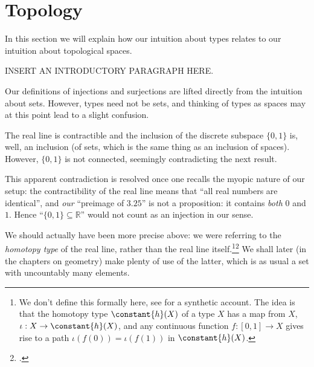 \section{Topology}

In this section we will explain how our intuition about types relates to our intuition about topological spaces.

INSERT AN INTRODUCTORY PARAGRAPH HERE.

\begin{remark}
  \label{rem:injectionsurjectionisnotwhatyouthink}
  Our definitions of injections and surjections are lifted directly from the intuition about sets.  However, types need not be sets, and
  thinking of types as spaces may at this point lead to a slight confusion.

  The real line is contractible and the inclusion of the discrete subspace $\{0,1\}$ is, well, an inclusion (of sets, which is the same thing as
  an inclusion of spaces).  However, $\{0,1\}$ is not connected, seemingly contradicting the next result.

  This apparent contradiction is resolved once one recalls the myopic nature of our setup: the contractibility of the real line means that ``all
  real numbers are identical'', and \emph{our} ``preimage of $3{.}25$'' is not a proposition: it contains \emph{both} $0$ and $1$.  Hence
  ``$\{0,1\}\subseteq\mathbb R$'' would not count as an injection in our sense.

  We should actually have been more precise above: we were referring to the \emph{homotopy type} of the real line, rather than the real line itself.\footnote{\label{ft:cohesive}%
    We don't define this formally here,
    see \citeauthor{Shulman-Real-Cohesive}\footnotemark{} for a synthetic account.
    The idea is that the homotopy type $\constant{h}(X)$ of a type $X$
    has a map from $X$, $\iota : X \to \constant{h}(X)$,
    and any continuous function $f : [0,1] \to X$
    gives rise to a path
    $\iota(f(0)) = \iota(f(1))$ in
    $\constant{h}(X)$.}\footcitetext{Shulman-Real-Cohesive}
  We shall later (in the chapters on geometry) make plenty of use of the latter,
  which is as usual a set with uncountably many elements.
\end{remark}

